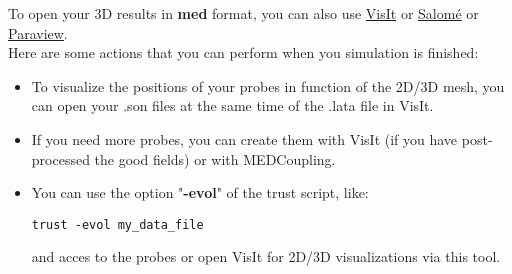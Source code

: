 To open your 3D results in \textbf{med} format, you can also use \href{https://wci.llnl.gov/simulation/computer-codes/visit}{VisIt} or \href{http://www.salome-platform.org}{Salom\'e} or \href{http://www.paraview.org}{Paraview}.\\

Here are some actions that you can perform when you simulation is finished:
\begin{itemize}
\item To visualize the positions of your probes in function of the 2D/3D mesh, you can open your .son files at the same time of the .lata file in VisIt.
\item If you need more probes, you can create them with VisIt (if you have post-processed the good fields) or with MEDCoupling.
\item You can use the option "\textbf{-evol}" of the trust script, like:
\begin{verbatim}
trust -evol my_data_file
\end{verbatim}
and acces to the probes or open VisIt for 2D/3D visualizations via this tool.
\end{itemize}



